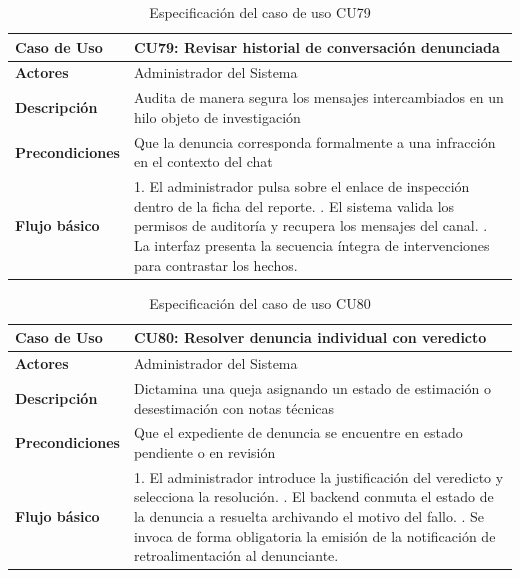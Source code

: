 \begin{table}[H]
\centering
\begin{tabular}{|p{3.2cm}|p{11.3cm}|}
\hline
\textbf{Caso de Uso} & \textbf{CU79: Revisar historial de conversación denunciada} \\ \hline
\textbf{Actores} & Administrador del Sistema \\ \hline
\textbf{Descripción} & Audita de manera segura los mensajes intercambiados en un hilo objeto de investigación \\ \hline
\textbf{Precondiciones} & Que la denuncia corresponda formalmente a una infracción en el contexto del chat \\ \hline
\textbf{Flujo básico} & 
1. El administrador pulsa sobre el enlace de inspección dentro de la ficha del reporte. \newline
2. El sistema valida los permisos de auditoría y recupera los mensajes del canal. \newline
3. La interfaz presenta la secuencia íntegra de intervenciones para contrastar los hechos. \\ \hline
\end{tabular}
\caption{Especificación del caso de uso CU79}
\label{tab:cu79}
\end{table}

\begin{table}[H]
\centering
\begin{tabular}{|p{3.2cm}|p{11.3cm}|}
\hline
\textbf{Caso de Uso} & \textbf{CU80: Resolver denuncia individual con veredicto} \\ \hline
\textbf{Actores} & Administrador del Sistema \\ \hline
\textbf{Descripción} & Dictamina una queja asignando un estado de estimación o desestimación con notas técnicas \\ \hline
\textbf{Precondiciones} & Que el expediente de denuncia se encuentre en estado pendiente o en revisión \\ \hline
\textbf{Flujo básico} & 
1. El administrador introduce la justificación del veredicto y selecciona la resolución. \newline
2. El backend conmuta el estado de la denuncia a resuelta archivando el motivo del fallo. \newline
3. Se invoca de forma obligatoria la emisión de la notificación de retroalimentación al denunciante. \\ \hline
\end{tabular}
\caption{Especificación del caso de uso CU80}
\label{tab:cu80}
\end{table}

